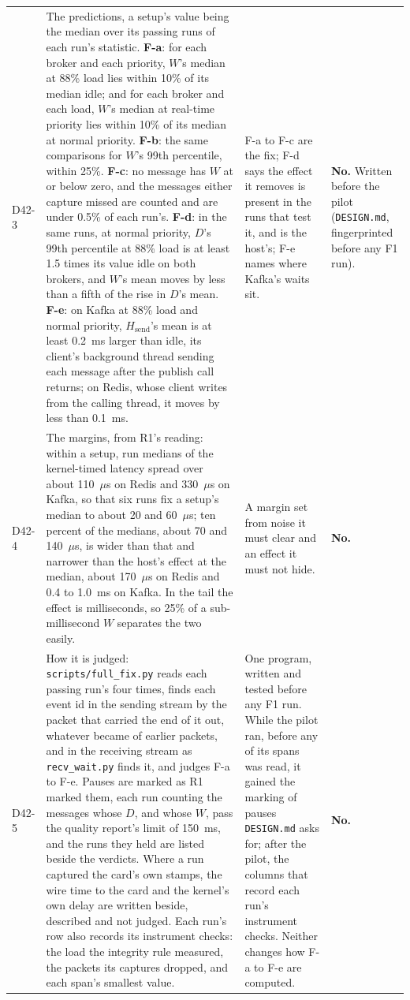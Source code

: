 \documentclass[11pt]{article}
\begin{document}
{\begin{longtable}{@{}p{1.1cm} >{\raggedright\arraybackslash}p{6.1cm} >{\raggedright\arraybackslash}p{6.0cm} >{\raggedright\arraybackslash}p{2.2cm}@{}}
D42-3 & The predictions, a setup's value being the median over its passing runs of each run's statistic. \textbf{F-a}: for each broker and each priority, $W$'s median at 88\% load lies within 10\% of its median idle; and for each broker and each load, $W$'s median at real-time priority lies within 10\% of its median at normal priority. \textbf{F-b}: the same comparisons for $W$'s 99th percentile, within 25\%. \textbf{F-c}: no message has $W$ at or below zero, and the messages either capture missed are counted and are under 0.5\% of each run's. \textbf{F-d}: in the same runs, at normal priority, $D$'s 99th percentile at 88\% load is at least 1.5 times its value idle on both brokers, and $W$'s mean moves by less than a fifth of the rise in $D$'s mean. \textbf{F-e}: on Kafka at 88\% load and normal priority, $H_{\mathrm{send}}$'s mean is at least 0.2~ms larger than idle, its client's background thread sending each message after the publish call returns; on Redis, whose client writes from the calling thread, it moves by less than 0.1~ms. & F-a to F-c are the fix; F-d says the effect it removes is present in the runs that test it, and is the host's; F-e names where Kafka's waits sit. & \textbf{No.} Written before the pilot (\texttt{DESIGN.md}, fingerprinted before any F1 run). \\
D42-4 & The margins, from R1's reading: within a setup, run medians of the kernel-timed latency spread over about 110~$\mu$s on Redis and 330~$\mu$s on Kafka, so that six runs fix a setup's median to about 20 and 60~$\mu$s; ten percent of the medians, about 70 and 140~$\mu$s, is wider than that and narrower than the host's effect at the median, about 170~$\mu$s on Redis and 0.4 to 1.0~ms on Kafka. In the tail the effect is milliseconds, so 25\% of a sub-millisecond $W$ separates the two easily. & A margin set from noise it must clear and an effect it must not hide. & \textbf{No.} \\
D42-5 & How it is judged: \texttt{scripts/full\_fix.py} reads each passing run's four times, finds each event id in the sending stream by the packet that carried the end of it out, whatever became of earlier packets, and in the receiving stream as \texttt{recv\_wait.py} finds it, and judges F-a to F-e. Pauses are marked as R1 marked them, each run counting the messages whose $D$, and whose $W$, pass the quality report's limit of 150~ms, and the runs they held are listed beside the verdicts. Where a run captured the card's own stamps, the wire time to the card and the kernel's own delay are written beside, described and not judged. Each run's row also records its instrument checks: the load the integrity rule measured, the packets its captures dropped, and each span's smallest value. & One program, written and tested before any F1 run. While the pilot ran, before any of its spans was read, it gained the marking of pauses \texttt{DESIGN.md} asks for; after the pilot, the columns that record each run's instrument checks. Neither changes how F-a to F-e are computed. & \textbf{No.} \\

\end{longtable}}
\end{document}
